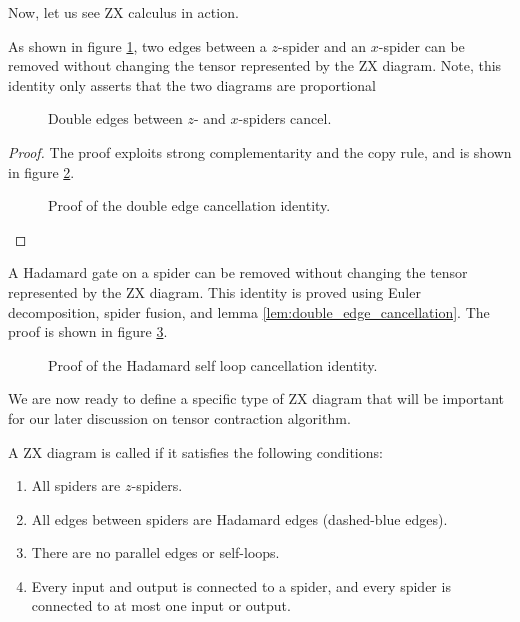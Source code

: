 Now, let us see ZX calculus in action.


\begin{lemma}\label{lem:double_edge_cancellation}
	As shown in figure \ref{fig:double_edge_cancellation}, two edges between a $z$-spider and an $x$-spider can be removed without changing the tensor represented by the ZX diagram.
	Note, this identity only asserts that the two diagrams are proportional
	\begin{figure}
		\centering 
		\caption{Double edges between $z$- and $x$-spiders cancel.} 
   	    
		\label{fig:double_edge_cancellation}
	\end{figure}
\end{lemma}


\begin{proof}
	The proof exploits strong complementarity and the copy rule, and is shown in figure \ref{eq:proof-cancellation}.

	\begin{figure}
		\centering
		\resizebox{\linewidth}{!}{
			
		}
		\caption{Proof of the double edge cancellation identity.}
		\label{eq:proof-cancellation}
	\end{figure}
\end{proof}

\begin{lemma}\label{lem:hadamard_self_loop_cancellation}
	A Hadamard gate on a spider can be removed without changing the tensor represented by the ZX diagram.
	This identity is proved using Euler decomposition, spider fusion, and lemma \ref{lem:double_edge_cancellation}. The proof is shown in figure \ref{fig:hadamard_self_loop_cancellation}.
\end{lemma}

\begin{figure}[ht]
	\centering
	\resizebox{0.8\linewidth}{!}{
		
	}
	\caption{Proof of the Hadamard self loop cancellation identity.}
	\label{fig:hadamard_self_loop_cancellation}
\end{figure}

We are now ready to define a specific type of ZX diagram that will be important for our later discussion on tensor contraction algorithm.

\begin{definition}
	A ZX diagram is called  if it satisfies the following conditions:
	\begin{enumerate}
		\item All spiders are $z$-spiders.
		\item All edges between spiders are Hadamard edges (dashed-blue edges).
		\item There are no parallel edges or self-loops.
		\item Every input and output is connected to a spider, and every spider is connected to at most one input or output.
	\end{enumerate}
\end{definition}

